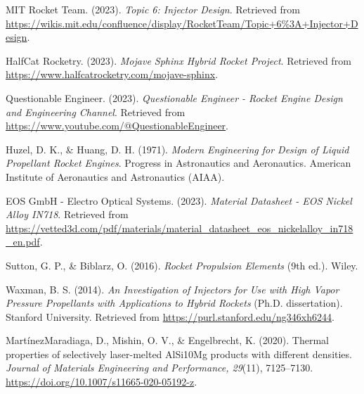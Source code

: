 \begin{thebibliography}{9}

MIT Rocket Team. (2023). \textit{Topic 6: Injector Design}. Retrieved from \url{https://wikis.mit.edu/confluence/display/RocketTeam/Topic+6%3A+Injector+Design}.

HalfCat Rocketry. (2023). \textit{Mojave Sphinx Hybrid Rocket Project}. Retrieved from \url{https://www.halfcatrocketry.com/mojave-sphinx}.

Questionable Engineer. (2023). \textit{Questionable Engineer - Rocket Engine Design and Engineering Channel}. Retrieved from \url{https://www.youtube.com/@QuestionableEngineer}.

Huzel, D. K., \& Huang, D. H. (1971). \textit{Modern Engineering for Design of Liquid Propellant Rocket Engines}. Progress in Astronautics and Aeronautics. American Institute of Aeronautics and Astronautics (AIAA).

EOS GmbH - Electro Optical Systems. (2023). \textit{Material Datasheet - EOS Nickel Alloy IN718}. Retrieved from \url{https://vetted3d.com/pdf/materials/material_datasheet_eos_nickelalloy_in718_en.pdf}.

Sutton, G. P., \& Biblarz, O. (2016). \textit{Rocket Propulsion Elements} (9th ed.). Wiley.

Waxman, B. S. (2014). \textit{An Investigation of Injectors for Use with High Vapor Pressure Propellants with Applications to Hybrid Rockets} (Ph.D. dissertation). Stanford University. Retrieved from \url{https://purl.stanford.edu/ng346xh6244}.


Martínez\-Maradiaga, D., Mishin, O. V., \& Engelbrecht, K. (2020). Thermal properties of selectively laser-melted AlSi10Mg products with different densities. \textit{Journal of Materials Engineering and Performance, 29}(11), 7125–7130. \url{https://doi.org/10.1007/s11665-020-05192-z}.
\end{thebibliography}